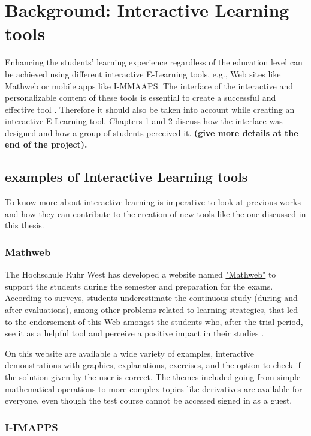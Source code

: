 \section{Background: Interactive Learning tools}

Enhancing the students' learning experience regardless of the education level can be achieved using different interactive E-Learning tools, e.g., Web sites like Mathweb or mobile apps like I-MMAAPS. The interface of the interactive and personalizable content of these tools is essential to create a successful and effective tool \cite{vltool}. Therefore it should also be taken into account while creating an interactive E-Learning tool. Chapters 1 and 2 discuss how the interface was designed  and how a group of students perceived it.\textbf{ (give more details at the end of the project). }



\subsection{examples of Interactive Learning tools}
To know more about interactive learning is imperative to look at previous works and how they can contribute to the creation of new tools like the one discussed in this thesis.

\subsubsection{Mathweb}
The Hochschule Ruhr West has developed a website named \href{https://mathweb.de/}{"Mathweb"}   to support the students during the semester and preparation for the exams. According to surveys,  students underestimate the continuous study (during and after evaluations), among other problems related to learning strategies, that led to the endorsement of this Web amongst the students who, after the trial period, see it as a helpful tool and perceive a positive impact in their studies \cite{MathWeb}.

On this website are available a wide variety of examples, interactive demonstrations with graphics, explanations, exercises, and the option to check if the solution given by the user is correct. The themes included going from simple mathematical operations to more complex topics like derivatives are available for everyone, even though the test course cannot be accessed signed in as a guest.

\subsubsection{I-IMAPPS}

